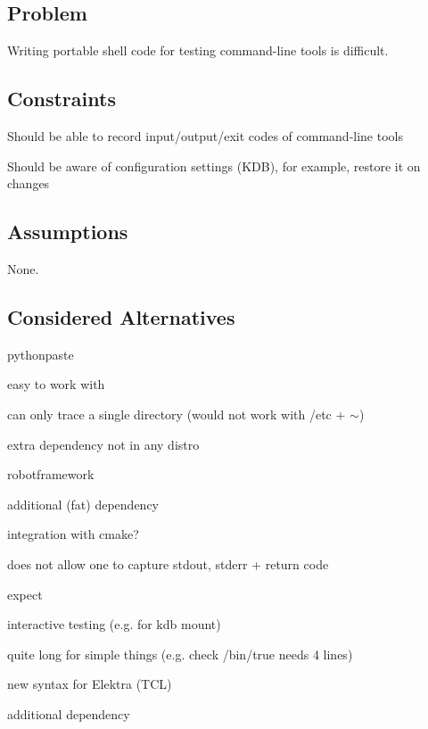 \subsection*{Problem}

Writing portable shell code for testing command-\/line tools is difficult.

\subsection*{Constraints}


\begin{DoxyItemize}
\item Should be able to record input/output/exit codes of command-\/line tools
\item Should be aware of configuration settings (K\+DB), for example, restore it on changes
\end{DoxyItemize}

\subsection*{Assumptions}

None.

\subsection*{Considered Alternatives}


\begin{DoxyItemize}
\item pythonpaste
\begin{DoxyItemize}
\item easy to work with
\item can only trace a single directory (would not work with /etc + $\sim$)
\item extra dependency not in any distro
\end{DoxyItemize}
\item robotframework
\begin{DoxyItemize}
\item additional (fat) dependency
\item integration with cmake?
\item does not allow one to capture stdout, stderr + return code
\end{DoxyItemize}
\item expect
\begin{DoxyItemize}
\item interactive testing (e.\+g. for kdb mount)
\item quite long for simple things (e.\+g. check /bin/true needs 4 lines)
\item new syntax for Elektra (T\+CL)
\item additional dependency
\end{DoxyItemize}
\end{DoxyItemize}

